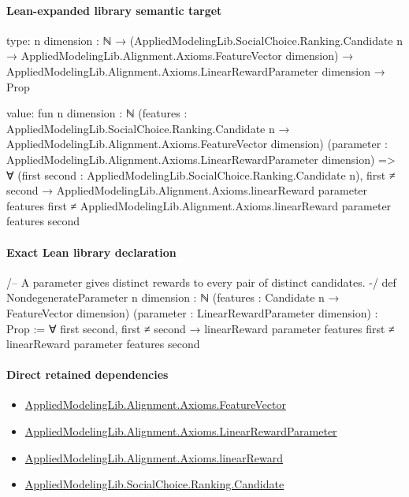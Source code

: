 \documentclass[10pt]{article}
\begin{document}
\paragraph{Lean-expanded library semantic target}
\begin{ReviewVerbatim}
type:
{n dimension : ℕ} →
  (AppliedModelingLib.SocialChoice.Ranking.Candidate n → AppliedModelingLib.Alignment.Axioms.FeatureVector dimension) →
    AppliedModelingLib.Alignment.Axioms.LinearRewardParameter dimension → Prop

value:
fun {n dimension : ℕ}
    (features :
      AppliedModelingLib.SocialChoice.Ranking.Candidate n → AppliedModelingLib.Alignment.Axioms.FeatureVector dimension)
    (parameter : AppliedModelingLib.Alignment.Axioms.LinearRewardParameter dimension) =>
  ∀ (first second : AppliedModelingLib.SocialChoice.Ranking.Candidate n),
    first ≠ second →
      AppliedModelingLib.Alignment.Axioms.linearReward parameter features first ≠
        AppliedModelingLib.Alignment.Axioms.linearReward parameter features second
\end{ReviewVerbatim}

\paragraph{Exact Lean library declaration}
\begin{ReviewVerbatim}
/-- A parameter gives distinct rewards to every pair of distinct candidates. -/
def NondegenerateParameter {n dimension : ℕ}
    (features : Candidate n → FeatureVector dimension)
    (parameter : LinearRewardParameter dimension) : Prop :=
  ∀ first second, first ≠ second →
    linearReward parameter features first ≠ linearReward parameter features second
\end{ReviewVerbatim}

\paragraph{Direct retained dependencies}
\begin{itemize}\raggedright
\item \hyperlink{library-prerequisite-a0b67c6a143b0b13}{Applied\allowbreak{}Modeling\allowbreak{}Lib.\allowbreak{}Alignment.\allowbreak{}Axioms.\allowbreak{}Feature\allowbreak{}Vector}
\item \hyperlink{library-prerequisite-d58203ca3f4a8c05}{Applied\allowbreak{}Modeling\allowbreak{}Lib.\allowbreak{}Alignment.\allowbreak{}Axioms.\allowbreak{}Linear\allowbreak{}Reward\allowbreak{}Parameter}
\item \hyperlink{library-prerequisite-4a32ddda17499d70}{Applied\allowbreak{}Modeling\allowbreak{}Lib.\allowbreak{}Alignment.\allowbreak{}Axioms.\allowbreak{}linear\allowbreak{}Reward}
\item \hyperlink{library-prerequisite-8c0e6c25845ae78a}{Applied\allowbreak{}Modeling\allowbreak{}Lib.\allowbreak{}Social\allowbreak{}Choice.\allowbreak{}Ranking.\allowbreak{}Candidate}
\end{itemize}
\end{document}

